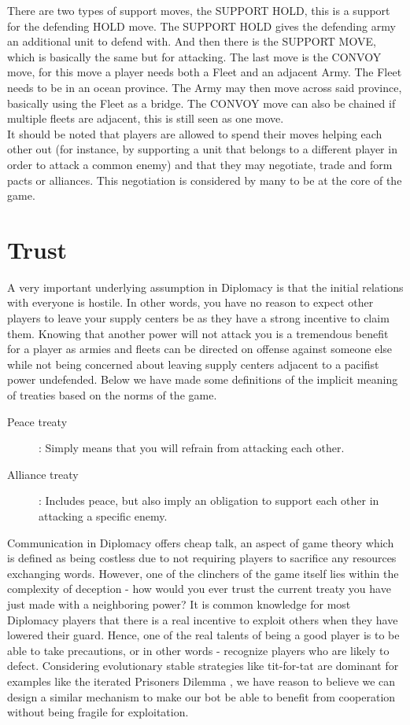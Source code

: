 \documentclass[a4paper]{article} %
\begin{document}
There are two types of support moves, the SUPPORT HOLD, this is a support for the defending HOLD move. The SUPPORT HOLD gives the defending army an additional unit to defend with. And then there is the SUPPORT MOVE, which is basically the same but for attacking. The last move is the CONVOY move, for this move a player needs both a Fleet and an adjacent Army. The Fleet needs to be in an ocean province. The Army may then move across said province, basically using the Fleet as a bridge.
The CONVOY move can also be chained if multiple fleets are adjacent, this is still seen as one move.
\\It should be noted that players are allowed to spend their moves helping each other out (for instance, by supporting a unit that belongs to a different player in order to attack a common enemy) and that they may negotiate, trade and form pacts or alliances. This negotiation is considered by many to be at the core of the game.

\section{Trust}


A very important underlying assumption in Diplomacy is that the initial relations with everyone is hostile. In other words, you have no reason to expect other players to leave your supply centers be as they have a strong incentive to claim them. Knowing that another power will not attack you is a tremendous benefit for a player as armies and fleets can be directed on offense against someone else while not being concerned about leaving supply centers adjacent to a pacifist power undefended. Below we have made some definitions of the implicit meaning of treaties based on the norms of the game.
\begin{description}
\item[Peace treaty]: Simply means that you will refrain from attacking each other.

\item[Alliance treaty]: Includes peace, but also imply an obligation to support each other in attacking a specific enemy.
\end{description}

Communication in Diplomacy offers cheap talk, an aspect of game theory which is defined as being costless due to not requiring players to sacrifice any resources exchanging words. However, one of the clinchers of the game itself lies within the complexity of deception - how would you ever trust the current treaty you have just made with a neighboring power? It is common knowledge for most Diplomacy players that there is a real incentive to exploit others when they have lowered their guard. Hence, one of the real talents of being a good player is to be able to take precautions, or in other words - recognize players who are likely to defect. Considering evolutionary stable strategies like tit-for-tat are dominant for examples like the iterated Prisoners Dilemma \cite{dilemmas}, we have reason to believe we can design a similar mechanism to make our bot be able to benefit from cooperation without being fragile for exploitation.
\end{document}

